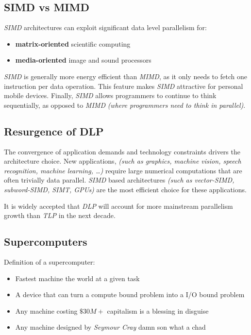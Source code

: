 \documentclass[english]{article}
\begin{document}
\subsection{SIMD vs MIMD}

\textit{SIMD} architectures can exploit significant data level parallelism for:

\begin{itemize}
  \item \textbf{matrix-oriented} scientific computing
  \item \textbf{media-oriented} image and sound processors
\end{itemize}

\textit{SIMD} is generally more energy efficient than \textit{MIMD}, as it only needs to fetch one instruction per data operation.
This feature makes \textit{SIMD} attractive for personal mobile devices.
Finally, \textit{SIMD} allows programmers to continue to think sequentially, as opposed to \textit{MIMD} \textit{(where programmers need to think in parallel)}.

\subsection{Resurgence of DLP}

The convergence of application demands and technology constraints drivers the architecture choice.
New applications, \textit{(such as graphics, machine vision, speech recognition, machine learning, \ldots)} require large numerical computations that are often trivially data parallel.
\textit{SIMD} based architectures \textit{(such as vector-SIMD, subword-SIMD, SIMT, GPUs)} are the most efficient choice for these applications.

It is widely accepted that \textit{DLP} will account for more mainstream parallelism growth than \textit{TLP} in the next decade.

\subsection{Supercomputers}

Definition of a supercomputer:

\begin{itemize}
  \item Fastest machine the world at a given task
  \item A device that can turn a compute bound problem into a I/O bound problem
  \item Any machine costing \(\$30M+\) {\tiny capitalism is a blessing in disguise}
  \item Any machine designed by \textit{Seymour Cray} {\tiny damn son what a chad}
\end{itemize}
\end{document}
